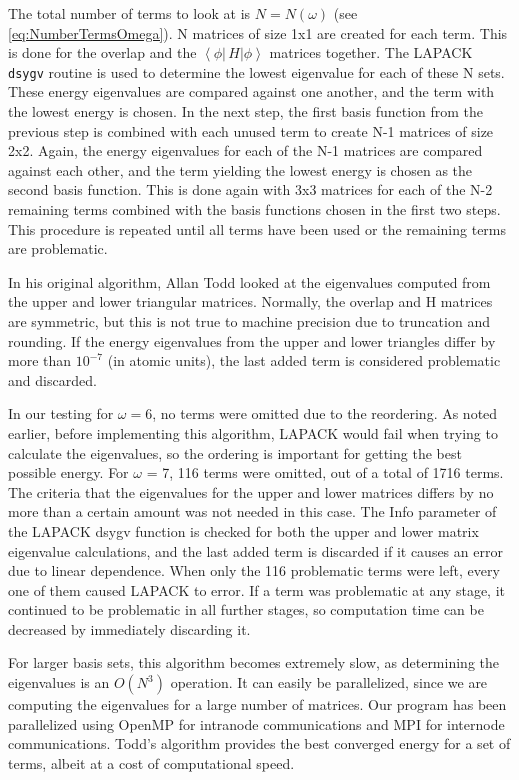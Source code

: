 \documentclass[Dissertation.tex]{subfiles}
\begin{document}
The total number of terms to look at is $N = N(\omega)$ (see \cref{eq:NumberTermsOmega}).
 N matrices of size 1x1 are created for each term. This 
is done for the overlap and the
 $\left\langle \phi \left| \,H \right| \phi \right\rangle$
 matrices together. The LAPACK \texttt{dsygv} routine is used to 
determine the lowest eigenvalue for each of these N sets. These energy 
eigenvalues are compared against one another, and the term with the lowest 
energy is chosen. In the next step, the first basis function from the 
previous step is combined with each unused term to create N-1 matrices of 
size 2x2. Again, the energy eigenvalues for each of the N-1 matrices are 
compared against each other, and the term yielding the lowest energy is 
chosen as the second basis function. This is done again with 3x3 matrices for 
each of the N-2 remaining terms combined with the basis functions chosen in 
the first two steps. This procedure is repeated until all terms have been 
used or the remaining terms are problematic.

In his original algorithm, Allan Todd looked at the eigenvalues computed from 
the upper and lower triangular matrices. Normally, the overlap and H matrices 
are symmetric, but this is not true to machine precision due to truncation 
and rounding. If the energy eigenvalues from the upper and lower triangles 
differ by more than $10^{-7}$ (in atomic units), the last added term is 
considered problematic and discarded.

In our testing for $\omega = 6$, no terms were omitted due to the reordering. 
As noted earlier, before implementing this algorithm, LAPACK would fail when 
trying to calculate the eigenvalues, so the ordering is important for getting 
the best possible energy. For $\omega$ = 7, 116 terms were omitted, out of a 
total of 1716 terms. The criteria that the eigenvalues for the upper and 
lower matrices differs by no more than a certain amount was not needed in 
this case. The Info parameter of the LAPACK dsygv function is checked for 
both the upper and lower matrix eigenvalue calculations, and the last added 
term is discarded if it causes an error due to linear dependence. When only 
the 116 problematic terms were left, every one of them caused LAPACK to 
error. If a term was problematic at any stage, it continued to be problematic 
in all further stages, so computation time can be decreased by immediately 
discarding it.

For larger basis sets, this algorithm becomes extremely slow, as determining 
the eigenvalues is an $O(N^3)$ operation. It can easily be parallelized, 
since we are computing the eigenvalues for a large number of matrices. Our 
program has been parallelized using OpenMP \cite{OpenMP} for intranode
communications and MPI \cite{MPI} for internode communications. Todd's
algorithm provides the best converged energy for a set of terms, albeit
at a cost of computational speed.
\end{document}
